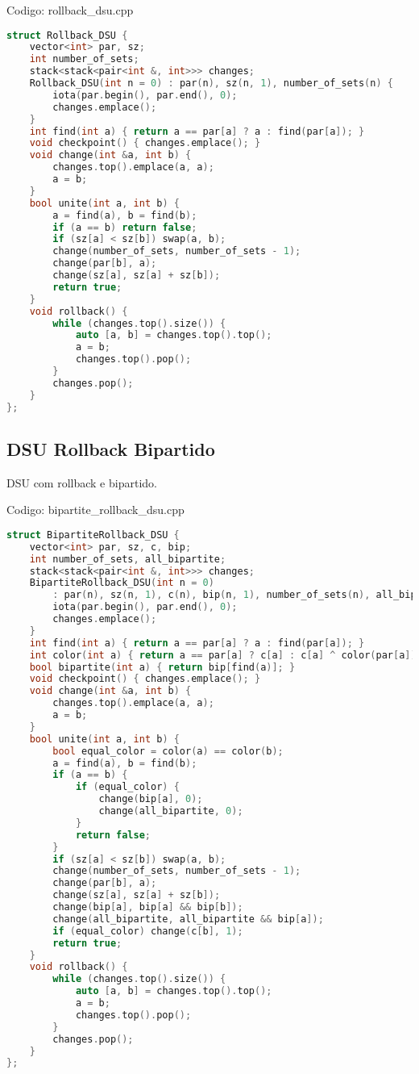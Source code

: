 \documentclass[10pt, a4paper, oneside]{book}
\begin{document}
\hfill

Codigo: rollback\_dsu.cpp

\begin{lstlisting}[language=C++]
struct Rollback_DSU {
    vector<int> par, sz;
    int number_of_sets;
    stack<stack<pair<int &, int>>> changes;
    Rollback_DSU(int n = 0) : par(n), sz(n, 1), number_of_sets(n) {
        iota(par.begin(), par.end(), 0);
        changes.emplace();
    }
    int find(int a) { return a == par[a] ? a : find(par[a]); }
    void checkpoint() { changes.emplace(); }
    void change(int &a, int b) {
        changes.top().emplace(a, a);
        a = b;
    }
    bool unite(int a, int b) {
        a = find(a), b = find(b);
        if (a == b) return false;
        if (sz[a] < sz[b]) swap(a, b);
        change(number_of_sets, number_of_sets - 1);
        change(par[b], a);
        change(sz[a], sz[a] + sz[b]);
        return true;
    }
    void rollback() {
        while (changes.top().size()) {
            auto [a, b] = changes.top().top();
            a = b;
            changes.top().pop();
        }
        changes.pop();
    }
};\end{lstlisting}
\hfill

\subsection{DSU Rollback Bipartido}


DSU com rollback e bipartido.

\hfill

Codigo: bipartite\_rollback\_dsu.cpp

\begin{lstlisting}[language=C++]
struct BipartiteRollback_DSU {
    vector<int> par, sz, c, bip;
    int number_of_sets, all_bipartite;
    stack<stack<pair<int &, int>>> changes;
    BipartiteRollback_DSU(int n = 0)
        : par(n), sz(n, 1), c(n), bip(n, 1), number_of_sets(n), all_bipartite(1) {
        iota(par.begin(), par.end(), 0);
        changes.emplace();
    }
    int find(int a) { return a == par[a] ? a : find(par[a]); }
    int color(int a) { return a == par[a] ? c[a] : c[a] ^ color(par[a]); }
    bool bipartite(int a) { return bip[find(a)]; }
    void checkpoint() { changes.emplace(); }
    void change(int &a, int b) {
        changes.top().emplace(a, a);
        a = b;
    }
    bool unite(int a, int b) {
        bool equal_color = color(a) == color(b);
        a = find(a), b = find(b);
        if (a == b) {
            if (equal_color) {
                change(bip[a], 0);
                change(all_bipartite, 0);
            }
            return false;
        }
        if (sz[a] < sz[b]) swap(a, b);
        change(number_of_sets, number_of_sets - 1);
        change(par[b], a);
        change(sz[a], sz[a] + sz[b]);
        change(bip[a], bip[a] && bip[b]);
        change(all_bipartite, all_bipartite && bip[a]);
        if (equal_color) change(c[b], 1);
        return true;
    }
    void rollback() {
        while (changes.top().size()) {
            auto [a, b] = changes.top().top();
            a = b;
            changes.top().pop();
        }
        changes.pop();
    }
};\end{lstlisting}
\hfill
\end{document}
